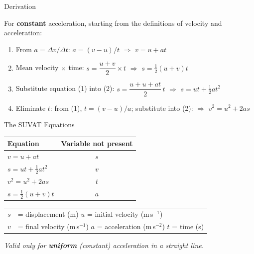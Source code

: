 \begin{formulabox}{Derivation}

For \textbf{constant} acceleration, starting from the definitions of velocity and acceleration:

\begin{enumerate}[itemsep=5pt]
  \item From $a = \Delta v / \Delta t$: \quad $a = (v - u)/t$
  \quad $\Rightarrow$ \quad $\boxed{v = u + at}$

  \item Mean velocity $\times$ time: \quad $s = \dfrac{u+v}{2} \times t$
  \quad $\Rightarrow$ \quad $\boxed{s = \tfrac{1}{2}(u+v)t}$

  \item Substitute equation (1) into (2):
  $s = \dfrac{u + u + at}{2}\,t$
  \quad $\Rightarrow$ \quad $\boxed{s = ut + \tfrac{1}{2}at^2}$

  \item Eliminate $t$: from (1), $t = (v-u)/a$; substitute into (2):
  \quad $\Rightarrow$ \quad $\boxed{v^2 = u^2 + 2as}$
\end{enumerate}

\end{formulabox}

\begin{formulabox}{The SUVAT Equations}
\begin{center}
\renewcommand{\arraystretch}{1.6}
\begin{tabular}{@{}lc@{}}
\toprule
\textbf{Equation} & \textbf{Variable not present} \\
\midrule
$v = u + at$                  & $s$ \\
$s = ut + \tfrac{1}{2}at^2$   & $v$ \\
$v^2 = u^2 + 2as$             & $t$ \\
$s = \tfrac{1}{2}(u+v)t$      & $a$ \\
\bottomrule
\end{tabular}
\end{center}
\vspace{0.5em}
\begin{tabular}{@{}ll@{}}
$s$ & = displacement (m) \qquad $u$ = initial velocity (m\,s$^{-1}$) \\
$v$ & = final velocity (m\,s$^{-1}$) \qquad $a$ = acceleration (m\,s$^{-2}$) \qquad $t$ = time (s) \\
\end{tabular}

\vspace{0.5em}
\textit{Valid only for \textbf{uniform} (constant) acceleration in a straight line.}
\end{formulabox}

